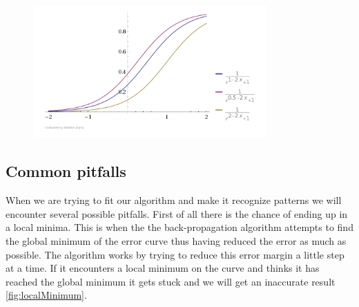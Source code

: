 \begin{figure}[!ht]
\centering
\includegraphics[width=0.8\textwidth ,natwidth=410,natheight=237]{billeder/ActivationFunctionsWithBias.png}
\caption{}
\label{fig:activationFunctionsWithBias}
\end{figure}

\subsection{Common pitfalls}
When we are trying to fit our algorithm and make it recognize patterns we will encounter several possible pitfalls. First of all there is the chance of ending up in a local minima. This is when the the back-propagation algorithm attempts to find the global minimum of the error curve thus having reduced the error as much as possible. The algorithm works by trying to reduce this error margin a little step at a time. If it encounters a local minimum on the curve and thinks it has reached the global minimum it gets stuck and we will get an inaccurate result \ref{fig:localMinimum}. 

